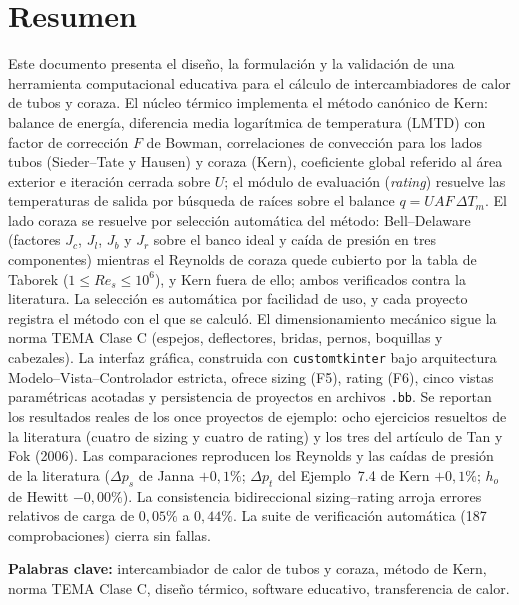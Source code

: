 \documentclass[11pt,a4paper]{article}
\begin{document}
\tableofcontents
\newpage

\section{Resumen}

Este documento presenta el dise\~no, la formulaci\'on y la validaci\'on de una
herramienta computacional educativa para el c\'alculo de intercambiadores de
calor de tubos y coraza. El n\'ucleo t\'ermico implementa el m\'etodo can\'onico
de Kern: balance de energ\'ia, diferencia media logar\'itmica de temperatura
(LMTD) con factor de correcci\'on $F$ de Bowman, correlaciones de convecci\'on
para los lados tubos (Sieder--Tate y Hausen) y coraza (Kern), coeficiente
global referido al \'area exterior e iteraci\'on cerrada sobre $U$; el m\'odulo
de evaluaci\'on (\emph{rating}) resuelve las temperaturas de salida por
b\'usqueda de ra\'ices sobre el balance $q = U A F \,\Delta T_m$. El lado coraza se resuelve por
selecci\'on autom\'atica del m\'etodo: Bell--Delaware (factores $J_c$,
$J_l$, $J_b$ y $J_r$ sobre el banco ideal y ca\'ida de presi\'on en tres
componentes) mientras el Reynolds de coraza quede cubierto por la tabla
de Taborek ($1 \le Re_s \le 10^6$), y Kern fuera de ello; ambos
verificados contra la literatura. La selecci\'on es autom\'atica por
facilidad de uso, y cada proyecto registra el m\'etodo con el que se
calcul\'o. El
dimensionamiento mec\'anico sigue la norma TEMA Clase C (espejos, deflectores,
bridas, pernos, boquillas y cabezales). La interfaz gr\'afica, construida con
\texttt{customtkinter} bajo arquitectura Modelo--Vista--Controlador estricta, ofrece
sizing (F5), rating (F6), cinco vistas param\'etricas acotadas y persistencia
de proyectos en archivos \texttt{.bb}. Se reportan los resultados reales de los
once proyectos de ejemplo: ocho ejercicios resueltos de la literatura
(cuatro de sizing y cuatro de rating) y los tres del art\'iculo de Tan y Fok (2006).
Las comparaciones reproducen los Reynolds y las ca\'idas de presi\'on de la
literatura ($\Delta p_s$ de Janna $+0{,}1\%$; $\Delta p_t$ del
Ejemplo~7.4 de Kern $+0{,}1\%$; $h_o$ de Hewitt $-0{,}00\%$). La
consistencia bidireccional sizing--rating arroja errores relativos de carga de
$0{,}05\%$ a $0{,}44\%$. La suite de verificaci\'on autom\'atica
(187 comprobaciones) cierra sin fallas.

\textbf{Palabras clave:} intercambiador de calor de tubos y coraza, m\'etodo de
Kern, norma TEMA Clase C, dise\~no t\'ermico, software educativo, transferencia
de calor.
\end{document}
